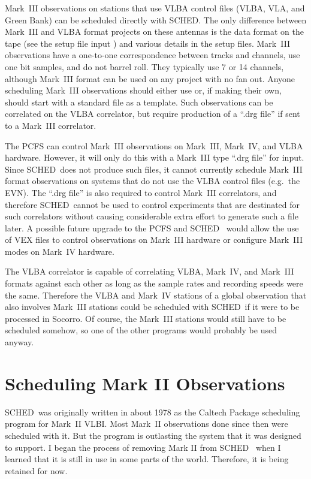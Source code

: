 \documentclass{report}
\newcommand{\sched}{{\sc SCHED}}
\newcommand{\schedb}{{\sc SCHED~}}
\begin{document}
Mark~III observations on stations that use VLBA control files (VLBA,
VLA, and Green Bank) can be scheduled directly with \sched.  The only
difference between Mark~III and VLBA format projects on these antennas
is the data format on the tape (see the setup file input ) and various details in the setup files.  Mark~III
observations have a one-to-one correspondence between tracks and
channels, use one bit samples, and do not barrel roll.  They typically
use 7 or 14 channels, although Mark~III format can be used on any
project with no fan out.  Anyone scheduling Mark~III observations
should either use  or, if
making their own, should start with a standard file as a template.
Such observations can be correlated on the VLBA correlator, but
require production of a ``.drg file'' if sent to a Mark~III correlator.

The PCFS can control Mark~III observations on Mark~III, Mark~IV, and
VLBA hardware.  However, it will only do this with a Mark~III type
``.drg file'' for input.  Since \schedb does not produce such files,
it cannot currently schedule Mark~III format observations on systems
that do not use the VLBA control files (e.g.\ the EVN).  The ``.drg
file'' is also required to control Mark~III correlators, and therefore
\schedb cannot be used to control experiments that are destinated for
such correlators without causing considerable extra effort to generate
such a file later.  A possible future upgrade to the PCFS and \schedb
would allow the use of VEX files to control observations on Mark~III
hardware or configure Mark~III modes on Mark~IV hardware.

The VLBA correlator is capable of correlating VLBA, Mark~IV, and
Mark~III formats against each other as long as the sample rates and
recording speeds were the same.  Therefore the VLBA and Mark~IV
stations of a global observation that also involves Mark~III stations
could be scheduled with \schedb if it were to be processed in Socorro.
Of course, the Mark~III stations would still have to be scheduled
somehow, so one of the other programs would probably be used anyway.


\section{\label{SEC:MKII}Scheduling Mark II Observations}

\schedb was originally written in about 1978 as the Caltech
Package scheduling program for Mark~II VLBI.  Most Mark~II
observations done since then were scheduled with it.  But the
program is outlasting the system that it was designed to
support.  I began the process of removing Mark II from \schedb
when I learned that it is still in use in some parts of the
world.  Therefore, it is being retained for now.
\end{document}
